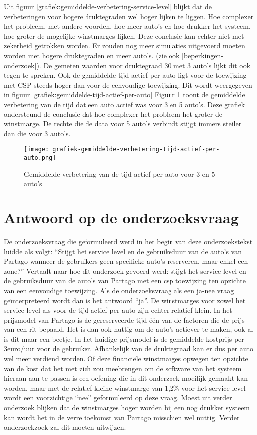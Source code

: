Uit figuur \ref{grafiek:gemiddelde-verbetering-service-level} blijkt dat de verbeteringen voor hogere druktegraden wel hoger lijken te liggen. Hoe complexer het probleem, met andere woorden, hoe meer auto's en hoe drukker het systeem, hoe groter de mogelijke winstmarges lijken. Deze conclusie kan echter niet met zekerheid getrokken worden. Er zouden nog meer simulaties uitgevoerd moeten worden met hogere druktegraden en meer auto's. (zie ook \ref{beperkingen-onderzoek}). De gemeten waarden voor druktegraad 30 met 3 auto's lijkt dit ook tegen te spreken.
Ook de gemiddelde tijd actief per auto ligt voor de toewijzing met CSP steeds hoger dan voor de eenvoudige toewijzing. Dit wordt weergegeven in figuur \ref{grafiek:gemiddelde-tijd-actief-per-auto} 
Figuur \ref{grafiek:gemiddelde-verbetering-tijd-actief} toont de gemiddelde verbetering van de tijd dat een auto actief was voor 3 en 5 auto's. Deze grafiek ondersteund de conclusie dat hoe complexer het probleem het groter de winstmarge. De rechte die de data voor 5 auto's verbindt stijgt immers steiler dan die voor 3 auto's.
\begin{figure}[h]
	\texttt{[image: grafiek-gemiddelde-verbetering-tijd-actief-per-auto.png]}
	\caption[Grafiek van de gemiddelde verbetering van de tijd actief per auto]{Gemiddelde verbetering van de tijd actief per auto voor 3 en 5 auto's}
	\label{grafiek:gemiddelde-verbetering-tijd-actief}
\end{figure}


\section{Antwoord op de onderzoeksvraag}
De onderzoeksvraag die geformuleerd werd in het begin van deze onderzoekstekst luidde als volgt: ``Stijgt het service level en de gebruiksduur van de auto's van Partago  wanneer de gebruikers geen specifieke auto's reserveren, maar enkel een zone?'' Vertaalt naar hoe dit onderzoek gevoerd werd: stijgt het service level en de gebruiksduur van de auto's van Partago met een csp toewijzing ten opzichte van een eenvoudige toewijzing. Als de onderzoeksvraag als een ja-nee vraag geïnterpreteerd wordt dan is het antwoord ``ja''. De winstmarges voor zowel het service level als voor de tijd actief per auto zijn echter relatief klein. In het prijsmodel van Partago is de gereserveerde tijd één van de factoren die de prijs van een rit bepaald. Het is dan ook nuttig om de auto's actiever te maken, ook al is dit maar een beetje. In het huidige prijsmodel is de gemiddelde kostprijs per 3euro/uur voor de gebruiker. Afhankelijk van de druktegraad kan er dus per auto wel meer verdiend worden. Of deze financiële winstmarges opwegen ten opzichte van de kost dat het met zich zou meebrengen om de software van het systeem hieraan aan te passen is een oefening die in dit onderzoek moeilijk gemaakt kan worden, maar met de relatief kleine winstmarge van 1,2\% voor het service level wordt een voorzichtige ``nee'' geformuleerd op deze vraag. Moest uit verder onderzoek blijken dat de winstmarges hoger worden bij een nog drukker systeem kan wordt het in de verre toekomst van Partago misschien wel nuttig. Verder onderzoekzoek zal dit moeten uitwijzen.

